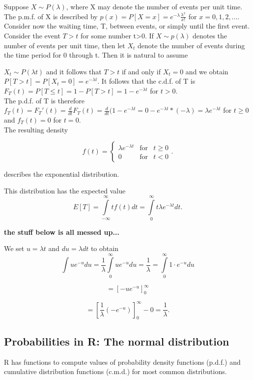 \documentclass[12pt,a4paper]{article}
\theoremstyle{regla}
\theoremstyle{remark}
\theoremstyle{definition}
\theoremstyle{nonumberbreak}
\begin{document}
\begin{xmpl}
Suppose $X \sim P(\lambda)$, where X may denote the number of events per unit time. The p.m.f. of X is described by $p(x)=P[X=x]=e^{-\lambda}\frac{\lambda^x}{x!}$ for $x=0,1,2,...$. Consider now the waiting time, T, between events, or simply until the first event. Consider the event $T>t$ for some number t>0. If $X\sim p(\lambda)$ denotes the number of events per unit time, then let $X_t$ denote the number of events during the time period for 0 through t. Then it is natural to assume

$X_t \sim P(\lambda t)$ and it follows that $T>t$ if and only if $X_t=0$ and we obtain $P[T>t]=P[X_t=0]=e^{-\lambda t}$.
It follows that the c.d.f. of T is $F_T(t)=P[T\leq t]=1-P[T>t]=1-e^{-\lambda t}$ for $t>0$.\\

The p.d.f. of T is therefore $f_T(t)=F_T'(t)=\frac{d}{dt}F_T(t)=\frac{d}{dt}(1-e^{-\lambda t}=0-e^{- \lambda t}*(-\lambda)=\lambda e^{-\lambda t}$ for $t \geq 0$ and $f_T(t)=0$ for $t=0$. \\

The resulting density 

$$f(t) =
\begin{cases}
  \lambda e^{-\lambda t} & \text{for}& t \geq0\\
  0 & \text{for} & t<0
\end{cases}.
$$

describes the exponential distribution.

This distribution has the expected value
$$E[T]=\int\limits^{\infty}_{-\infty} tf(t)dt=\int\limits^{\infty}_{0} t \lambda e^{-\lambda t}dt.$$

\textbf{the stuff below is all messed up...}

We set $u=\lambda t$ and $du=\lambda dt$ to obtain
$$\int ue^{-u}du= \frac{1}{\lambda}\int\limits^{\infty}_{0} ue^{-u}du=\frac{1}{\lambda}=
\int\limits^{\infty}_{0} 1 \cdot e^{-u}du$$

$$=\left [ -ue^{-u}\right ] _0^{\infty}$$

$$=\left[\frac{1}{\lambda}(-e^{-u})\right]_{0}^{\infty} -0=\frac{1}{\lambda} .$$
\end {xmpl}


\subsection{Probabilities in R: The normal distribution}
\begin{fbox}
\begin{minipage}{0.97\textwidth}
R has functions to compute values of probability density functions (p.d.f.) and cumulative distribution functions (c.m.d.) for most common distributions.  
\end{minipage}
\end{fbox}
\end{document}
